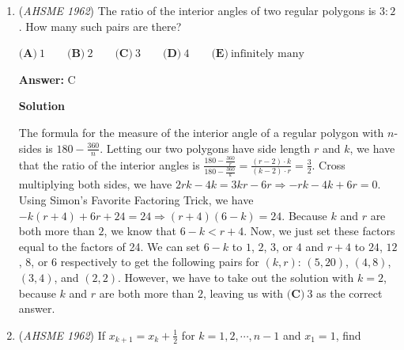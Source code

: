 \begin{enumerate}
 How many of these imply the negation of the statement "$p$ and $q$ are both true"?


 $\textbf{(A)}\ 0 \qquad  \textbf{(B)}\ 1 \qquad  \textbf{(C)}\ 2 \qquad  \textbf{(D)}\ 3 \qquad  \textbf{(E)}\ 4$

 \textbf{Answer: }D



\textbf{Solution}

By De Morgan's Law, the negation of $p$ and $q$ are both true is that at least one of them is false, with the exception of the statement 1, i.e.;

 $\text{p and q are both true}.$

 The other three statements state that at least one statement is false. So, 2, 3, and 4 work, yielding an answer of 3, or $\textbf{(D)}.$



	\item (\textit{AHSME 1962}) The ratio of the interior angles of two regular polygons is $3:2$. How many such pairs are there?


 $\textbf{(A)}\ 1 \qquad  \textbf{(B)}\ 2 \qquad  \textbf{(C)}\ 3 \qquad  \textbf{(D)}\ 4 \qquad  \textbf{(E)}\ \text{infinitely many}$

 \textbf{Answer: }C



\textbf{Solution}

The formula for the measure of the interior angle of a regular polygon with $n$-sides is $180 - \frac{360}{n}$. Letting our two polygons have side length $r$ and $k$, we have that the ratio of the interior angles is $\frac{180 - \frac{360}{r}}{180 - \frac{360}{k}} = \frac{(r-2) \cdot k}{(k-2) \cdot r} = \frac{3}{2}$.  Cross multiplying both sides, we have $2rk-4k = 3kr-6r \Rightarrow -rk-4k+6r = 0$. Using Simon's Favorite Factoring Trick, we have $-k(r+4)+6r+24 = 24 \Rightarrow (r+4)(6-k)=24$. Because $k$ and $r$ are both more than $2$, we know that $6-k < r+4$. Now, we just set these factors equal to the factors of 24. We can set $6-k$ to $1$, $2$, $3$, or $4$ and $r+4$ to $24$, $12$, $8$, or $6$ respectively to get the following pairs for $(k, r)$: $(5, 20)$, $(4, 8)$, $(3, 4)$, and $(2, 2)$. However, we have to take out the solution with $k = 2$, because $k$ and $r$ are both more than $2$, leaving us with $\boxed{\textbf{(C)}\ 3}$ as the correct answer.

 


	\item (\textit{AHSME 1962}) If $x_{k+1} = x_k + \frac{1}{2}$ for $k = 1, 2, \cdots, n - 1$ and $x_1 = 1$, find


\end{enumerate}
